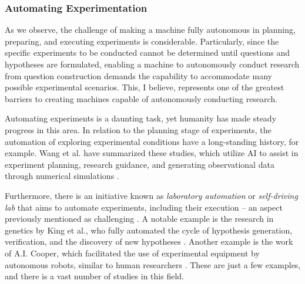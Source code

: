 
\subsubsection{Automating Experimentation}
As we observe, the challenge of making a machine fully autonomous in planning, preparing, and executing experiments is considerable. Particularly, since the specific experiments to be conducted cannot be determined until questions and hypotheses are formulated, enabling a machine to autonomously conduct research from question construction demands the capability to accommodate many possible experimental scenarios. This, I believe, represents one of the greatest barriers to creating machines capable of autonomously conducting research.

Automating experiments is a daunting task, yet humanity has made steady progress in this area. In relation to the planning stage of experiments, the automation of exploring experimental conditions have a long-standing history, for example. Wang et al. have summarized these studies, which utilize AI to assist in experiment planning, research guidance, and generating observational data through numerical simulations \cite{wang2023scientific}.

Furthermore, there is an initiative known as \textit{laboratory automation} or \textit{self-driving lab} that aims to automate experiments, including their execution – an aspect previously mentioned as challenging \cite{holland2020automation,abolhasani2023rise}. A notable example is the research in genetics by King et al., who fully automated the cycle of hypothesis generation, verification, and the discovery of new hypotheses \cite{king2004functional}. Another example is the work of A.I. Cooper, which facilitated the use of experimental equipment by autonomous robots, similar to human researchers \cite{burger2020mobile}. These are just a few examples, and there is a vast number of studies in this field.

